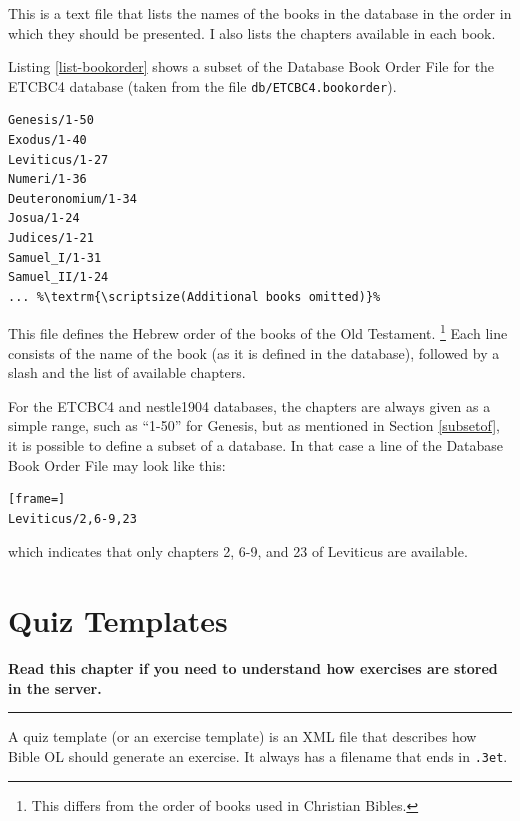 \documentclass[11pt,oneside,a4paper]{memoir}
\begin{document}
This is a text file that lists the names of the books in the database in the order in which they
should be presented. I also lists the chapters available in each book.

Listing \ref{list-bookorder} shows a subset of the Database Book Order File for the ETCBC4 database
(taken from the file \texttt{db/ETCBC4.bookorder}).

\begin{lstlisting}[caption=A subset of the ETCBC4 Book Order File,label=list-bookorder]
Genesis/1-50
Exodus/1-40
Leviticus/1-27
Numeri/1-36
Deuteronomium/1-34
Josua/1-24
Judices/1-21
Samuel_I/1-31
Samuel_II/1-24
... %\textrm{\scriptsize(Additional books omitted)}%
\end{lstlisting}

This file defines the Hebrew order of the books of the Old Testament.%
%
\footnote{This differs from the order of books used in Christian Bibles.} Each line
consists of the name of the book (as it is defined in the database), followed by a slash and the
list of available chapters.

For the ETCBC4 and nestle1904 databases, the chapters are always given as a simple range, such as
``1-50'' for Genesis, but as mentioned in Section \ref{subsetof}, it is possible to define a
subset of a database. In that case a line of the Database Book Order File may look like this:

\begin{lstlisting}[frame=]
Leviticus/2,6-9,23
\end{lstlisting}

\noindent
which indicates that only chapters 2, 6-9, and 23 of Leviticus are available.


\chapter{Quiz Templates}

\textbf{Read this chapter if you need to understand how exercises are stored in the server.}
\plainbreak{3}


A quiz template (or an exercise template) is an XML
file that describes how Bible OL should generate an exercise. It always has a filename that ends in
\texttt{.3et}.
\end{document}
